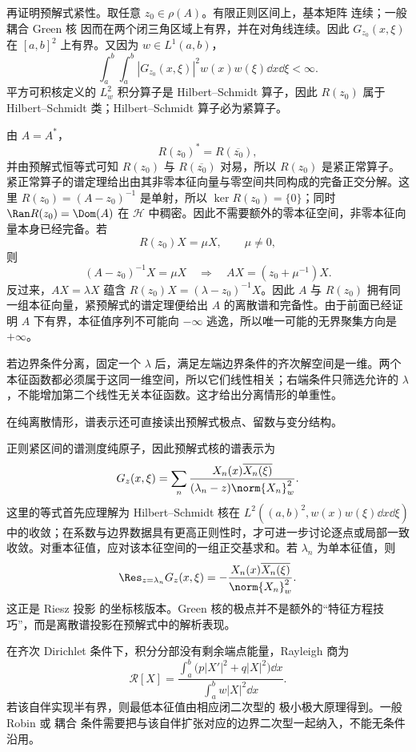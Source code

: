 再证明预解式紧性。取任意 $z_0\in\rho(A)$。有限正则区间上，基本矩阵 连续；一般 耦合 Green 核 因而在两个闭三角区域上有界，并在对角线连续。因此 $G_{z_0}(x,\xi)$ 在 $[a,b]^2$ 上有界。又因为 $w\in L^1(a,b)$，
\[
 \int_a^b\int_a^b
 |G_{z_0}(x,\xi)|^2w(x)w(\xi)\dd x\dd\xi<\infty.
\]
平方可积核定义的 $L^2_w$ 积分算子是 Hilbert--Schmidt 算子，因此 $R(z_0)$ 属于 Hilbert--Schmidt 类；Hilbert--Schmidt 算子必为紧算子。

由 $A=A^*$，
\[
 R(z_0)^*=R(\overline{z_0}),
\]
并由预解式恒等式可知 $R(z_0)$ 与 $R(\overline{z_0})$ 对易，所以 $R(z_0)$ 是紧正常算子。紧正常算子的谱定理给出由其非零本征向量与零空间共同构成的完备正交分解。这里 $R(z_0)=(A-z_0)^{-1}$ 是单射，所以 $\ker R(z_0)=\{0\}$；同时 $\Ran R(z_0)=\Dom(A)$ 在 $\mathcal H$ 中稠密。因此不需要额外的零本征空间，非零本征向量本身已经完备。若
\[
 R(z_0)X=\mu X,\qquad \mu\neq0,
\]
则
\[
 (A-z_0)^{-1}X=\mu X
 \quad\Longrightarrow\quad
 AX=\left(z_0+\mu^{-1}\right)X.
\]
反过来，$AX=\lambda X$ 蕴含 $R(z_0)X=(\lambda-z_0)^{-1}X$。因此 $A$ 与 $R(z_0)$ 拥有同一组本征向量，紧预解式的谱定理便给出 $A$ 的离散谱和完备性。由于前面已经证明 $A$ 下有界，本征值序列不可能向 $-\infty$ 逃逸，所以唯一可能的无界聚集方向是 $+\infty$。

若边界条件分离，固定一个 $\lambda$ 后，满足左端边界条件的齐次解空间是一维。两个本征函数都必须属于这同一维空间，所以它们线性相关；右端条件只筛选允许的 $\lambda$，不能增加第二个线性无关本征函数。这才给出分离情形的单重性。

在纯离散情形，谱表示还可直接读出预解式极点、留数与变分结构。

正则紧区间的谱测度纯原子，因此预解式核的谱表示为
\begin{equation*}G_z(x,\xi)
 =\sum_n
 \frac{X_n(x)\overline{X_n(\xi)}}{(\lambda_n-z)\norm{X_n}_w^2}.
\end{equation*}
这里的等式首先应理解为 Hilbert--Schmidt 核在
$L^2((a,b)^2,w(x)w(\xi)\dd x\dd\xi)$ 中的收敛；在系数与边界数据具有更高正则性时，才可进一步讨论逐点或局部一致收敛。对重本征值，应对该本征空间的一组正交基求和。若 $\lambda_n$ 为单本征值，则
\begin{equation}\label{eq:math-sl-residue-formula}
 \Res_{z=\lambda_n}G_z(x,\xi)
 =-\frac{X_n(x)\overline{X_n(\xi)}}{\norm{X_n}_w^2}.
\end{equation}
这正是 Riesz 投影 的坐标核版本。Green 核的极点并不是额外的“特征方程技巧”，而是离散谱投影在预解式中的解析表现。

在齐次 Dirichlet 条件下，积分分部没有剩余端点能量，Rayleigh 商为
\begin{equation}\label{eq:math-sl-rayleigh-dirichlet}
 \mathscr R[X]
 =\frac{\displaystyle\int_a^b\bigl(p|X'|^2+q|X|^2\bigr)\dd x}
 {\displaystyle\int_a^b w|X|^2\dd x}.
\end{equation}
若该自伴实现半有界，则最低本征值由相应闭二次型的 极小极大原理得到。一般 Robin 或 耦合 条件需要把与该自伴扩张对应的边界二次型一起纳入，不能无条件沿用。

